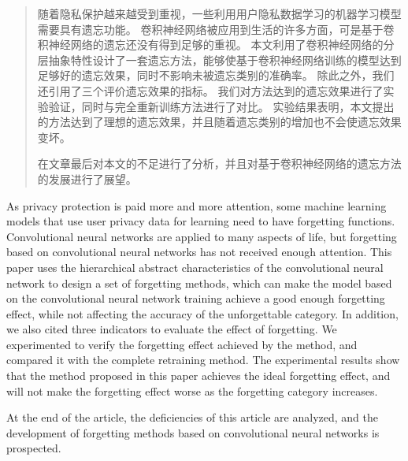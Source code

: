 

\begin{abstract}
  随着隐私保护越来越受到重视，一些利用用户隐私数据学习的机器学习模型需要具有遗忘功能。
  卷积神经网络被应用到生活的许多方面，可是基于卷积神经网络的遗忘还没有得到足够的重视。
  本文利用了卷积神经网络的分层抽象特性设计了一套遗忘方法，能够使基于卷积神经网络训练的模型达到足够好的遗忘效果，同时不影响未被遗忘类别的准确率。
  除此之外，我们还引用了三个评价遗忘效果的指标。
  我们对方法达到的遗忘效果进行了实验验证，同时与完全重新训练方法进行了对比。
  实验结果表明，本文提出的方法达到了理想的遗忘效果，并且随着遗忘类别的增加也不会使遗忘效果变坏。

  在文章最后对本文的不足进行了分析，并且对基于卷积神经网络的遗忘方法的发展进行了展望。

\end{abstract}

\begin{abstract*}
  As privacy protection is paid more and more attention, some machine learning models that use user privacy data for learning need to have forgetting functions.
  Convolutional neural networks are applied to many aspects of life, but forgetting based on convolutional neural networks has not received enough attention.
  This paper uses the hierarchical abstract characteristics of the convolutional neural network to design a set of forgetting methods, which can make the model based on the convolutional neural network training achieve a good enough forgetting effect, while not affecting the accuracy of the unforgettable category.
  In addition, we also cited three indicators to evaluate the effect of forgetting.
  We experimented to verify the forgetting effect achieved by the method, and compared it with the complete retraining method.
  The experimental results show that the method proposed in this paper achieves the ideal forgetting effect, and will not make the forgetting effect worse as the forgetting category increases.

  At the end of the article, the deficiencies of this article are analyzed, and the development of forgetting methods based on convolutional neural networks is prospected.
\end{abstract*}
